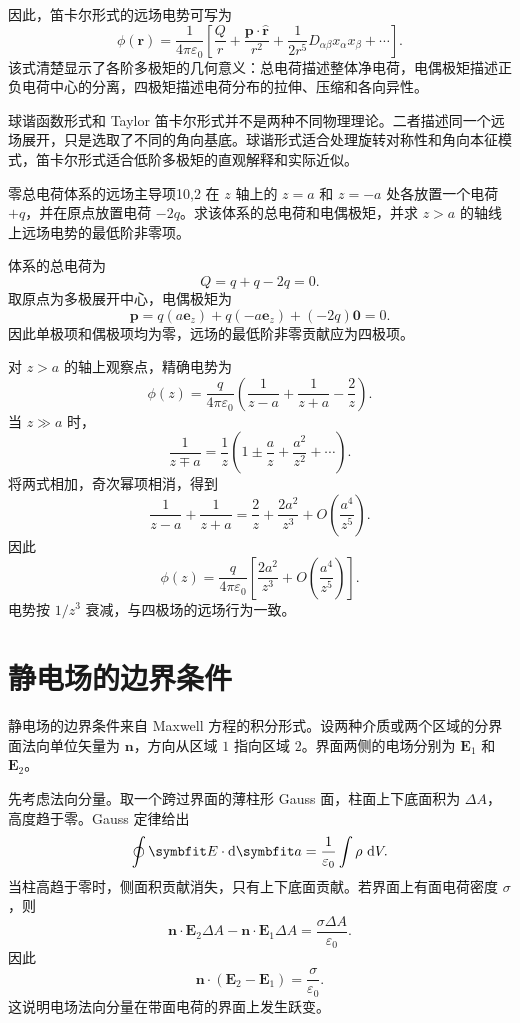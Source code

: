 因此，笛卡尔形式的远场电势可写为
\begin{equation}
	\phi(\bm{r})
	=
	\frac{1}{4\pi\varepsilon_{0}}
	\left[
	\frac{Q}{r}
	+
	\frac{\bm{p}\cdot\hat{\bm{r}}}{r^{2}}
	+
	\frac{1}{2r^{5}}
	D_{\alpha\beta}x_{\alpha}x_{\beta}
	+\cdots
	\right].
	\label{eq:10:cartesian-multipole}
\end{equation}
该式清楚显示了各阶多极矩的几何意义：总电荷描述整体净电荷，电偶极矩描述正负电荷中心的分离，四极矩描述电荷分布的拉伸、压缩和各向异性。

球谐函数形式和 Taylor 笛卡尔形式并不是两种不同物理理论。二者描述同一个远场展开，只是选取了不同的角向基底。球谐形式适合处理旋转对称性和角向本征模式，笛卡尔形式适合低阶多极矩的直观解释和实际近似。

\begin{example}{零总电荷体系的远场主导项}{10,2}
在 $z$ 轴上的 $z=a$ 和 $z=-a$ 处各放置一个电荷 $+q$，并在原点放置电荷 $-2q$。求该体系的总电荷和电偶极矩，并求 $z>a$ 的轴线上远场电势的最低阶非零项。

\begin{solution}
体系的总电荷为
\[
Q=q+q-2q=0.
\]
取原点为多极展开中心，电偶极矩为
\[
\bm{p}
=
q(a\bm{e}_{z})
+
q(-a\bm{e}_{z})
+
(-2q)\bm{0}
=
0.
\]
因此单极项和偶极项均为零，远场的最低阶非零贡献应为四极项。

对 $z>a$ 的轴上观察点，精确电势为
\[
\phi(z)
=
\frac{q}{4\pi\varepsilon_{0}}
\left(
\frac{1}{z-a}
+
\frac{1}{z+a}
-
\frac{2}{z}
\right).
\]
当 $z\gg a$ 时，
\[
\frac{1}{z\mp a}
=
\frac{1}{z}
\left(
1\pm\frac{a}{z}+\frac{a^{2}}{z^{2}}+\cdots
\right).
\]
将两式相加，奇次幂项相消，得到
\[
\frac{1}{z-a}
+
\frac{1}{z+a}
=
\frac{2}{z}
+
\frac{2a^{2}}{z^{3}}
+
O\left(\frac{a^{4}}{z^{5}}\right).
\]
因此
\[
\phi(z)
=
\frac{q}{4\pi\varepsilon_{0}}
\left[
\frac{2a^{2}}{z^{3}}
+
O\left(\frac{a^{4}}{z^{5}}\right)
\right].
\]
电势按 $1/z^{3}$ 衰减，与四极场的远场行为一致。
\end{solution}
\end{example}

\section{静电场的边界条件}

静电场的边界条件来自 Maxwell 方程的积分形式。设两种介质或两个区域的分界面法向单位矢量为 $\bm{n}$，方向从区域 $1$ 指向区域 $2$。界面两侧的电场分别为 $\bm{E}_{1}$ 和 $\bm{E}_{2}$。

先考虑法向分量。取一个跨过界面的薄柱形 Gauss 面，柱面上下底面积为 $\Delta A$，高度趋于零。Gauss 定律给出
\[
\oint \bm{E}\cdot\dif\bm{a}
=
\frac{1}{\varepsilon_{0}}
\int \rho\,\dif V.
\]
当柱高趋于零时，侧面积贡献消失，只有上下底面贡献。若界面上有面电荷密度 $\sigma$，则
\[
\bm{n}\cdot\bm{E}_{2}\Delta A
-
\bm{n}\cdot\bm{E}_{1}\Delta A
=
\frac{\sigma \Delta A}{\varepsilon_{0}}.
\]
因此
\begin{equation}
	\bm{n}\cdot(\bm{E}_{2}-\bm{E}_{1})
	=
	\frac{\sigma}{\varepsilon_{0}}.
	\label{eq:10:boundary-normal-e}
\end{equation}
这说明电场法向分量在带面电荷的界面上发生跃变。

